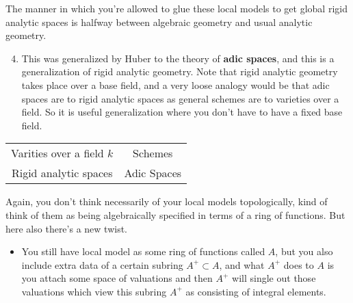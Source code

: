 The manner in which you're allowed to glue these local models to get global rigid analytic spaces is halfway between algebraic geometry and usual analytic geometry.


\begin{enumerate}
    \setcounter{enumi}{3} 

    \item This was generalized by Huber to the theory of \textbf{adic spaces}, and this is a generalization of rigid analytic geometry. Note that rigid analytic geometry takes place over a base field, and a very loose analogy would be that adic spaces are to rigid analytic spaces as general schemes are to varieties over a field. So it is useful generalization where you don't have to have a fixed base field.
\end{enumerate}

\begin{center}
\begin{tabular}{ |c|c| } 
 \hline
 Varities over a field $k$ & Schemes \\ 
 Rigid analytic spaces & Adic Spaces \\ 

 \hline
\end{tabular}
\end{center}


Again, you don't think necessarily of your local models topologically, kind of think of them as being algebraically specified in terms of a ring of functions. But here also there's a new twist. 

\begin{itemize}
    \item  You still have local model as some ring of functions called $A$, but you also include extra data of a certain subring $A^+ \subset A $, and what $A^{+}$ does to $A$ is you attach some space of valuations and then $A^+$ will single out those valuations which view this subring $A^+$ as consisting of integral elements.
\end{itemize}

